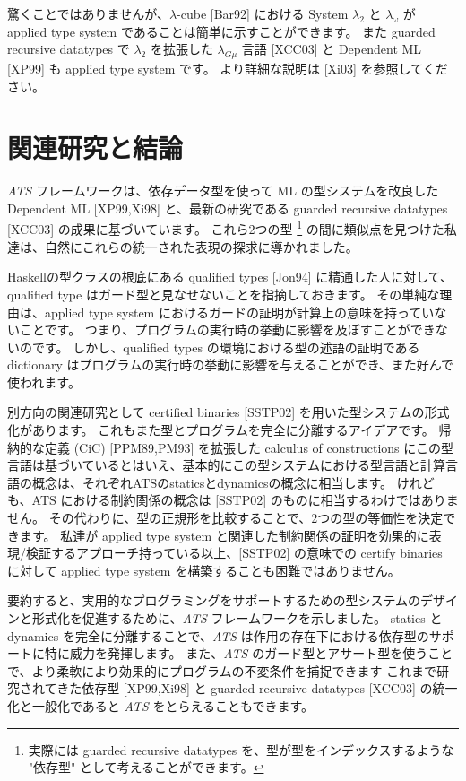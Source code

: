 \documentclass[submit,techreq,noauthor,onecolumn]{ipsj}
\begin{document}
驚くことではありませんが、$\lambda$-cube [Bar92] における System $\lambda_2$ と $\lambda_{\omega}$ が applied type system であることは簡単に示すことができます。
また guarded recursive datatypes で $\lambda_2$ を拡張した $\lambda_{G\mu}$ 言語 [XCC03] と Dependent ML [XP99] も applied type system です。
より詳細な説明は [Xi03] を参照してください。

\section{関連研究と結論}

{\it ATS} フレームワークは、依存データ型を使って ML の型システムを改良した Dependent ML [XP99,Xi98] と、最新の研究である guarded recursive datatypes [XCC03] の成果に基づいています。
これら2つの型
\footnote{実際には guarded recursive datatypes を、型が型をインデックスするような "依存型" として考えることができます。}
の間に類似点を見つけた私達は、自然にこれらの統一された表現の探求に導かれました。

Haskellの型クラスの根底にある qualified types [Jon94] に精通した人に対して、qualified type はガード型と見なせないことを指摘しておきます。
その単純な理由は、applied type system におけるガードの証明が計算上の意味を持っていないことです。
つまり、プログラムの実行時の挙動に影響を及ぼすことができないのです。
しかし、qualified types の環境における型の述語の証明である dictionary はプログラムの実行時の挙動に影響を与えることができ、また好んで使われます。

別方向の関連研究として certified binaries [SSTP02] を用いた型システムの形式化があります。
これもまた型とプログラムを完全に分離するアイデアです。
帰納的な定義 (CiC) [PPM89,PM93] を拡張した calculus of constructions にこの型言語は基づいているとはいえ、基本的にこの型システムにおける型言語と計算言語の概念は、それぞれATSのstaticsとdynamicsの概念に相当します。
けれども、ATS における制約関係の概念は [SSTP02] のものに相当するわけではありません。
その代わりに、型の正規形を比較することで、2つの型の等価性を決定できます。
私達が applied type system と関連した制約関係の証明を効果的に表現/検証するアプローチ持っている以上、[SSTP02] の意味での certify binaries に対して applied type system を構築することも困難ではありません。

要約すると、実用的なプログラミングをサポートするための型システムのデザインと形式化を促進するために、{\it ATS} フレームワークを示しました。
statics と dynamics を完全に分離することで、{\it ATS} は作用の存在下における依存型のサポートに特に威力を発揮します。
また、{\it ATS} のガード型とアサート型を使うことで、より柔軟により効果的にプログラムの不変条件を捕捉できます
これまで研究されてきた依存型 [XP99,Xi98] と guarded recursive datatypes [XCC03] の統一化と一般化であると {\it ATS} をとらえることもできます。
\end{document}
